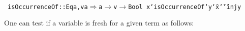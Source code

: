 \documentclass[9pt,authoryear]{sigplanconf}
\begin{document}
%
%
%
~\\~\vphantom{$\{$}\texttt{isOccurrenceOf}\texttt{\mbox{\hspace{0.50em}}}\texttt{{:}{:}}\texttt{\mbox{\hspace{0.50em}}}\texttt{\makebox[1.22ex][l]{$ {(} $}}\texttt{Eq}\texttt{\mbox{\hspace{0.50em}}}\texttt{a,}\texttt{\mbox{\hspace{0.50em}}}\texttt{v}\texttt{\mbox{\hspace{0.50em}}}\texttt{\makebox[1.22ex][c]{$ \in $}}\texttt{\mbox{\hspace{0.50em}}}\texttt{a}\texttt{\makebox[1.22ex][r]{$ {)} $}}\texttt{\mbox{\hspace{0.50em}}}\texttt{$ \Rightarrow $}\texttt{\mbox{\hspace{0.50em}}}\texttt{a}\texttt{\mbox{\hspace{0.50em}}}\texttt{$ \rightarrow $}\texttt{\mbox{\hspace{0.50em}}}\texttt{v}\texttt{\mbox{\hspace{0.50em}}}\texttt{$ \rightarrow $}\texttt{\mbox{\hspace{0.50em}}}\texttt{Bool}\texttt{{\nopagebreak \newline%
}\vphantom{$\{$}}\texttt{x}\texttt{\mbox{\hspace{0.50em}}}\texttt{{`}isOccurrenceOf{`}}\texttt{\mbox{\hspace{0.50em}}}\texttt{y}\texttt{\mbox{\hspace{0.50em}}}\texttt{{\char `\=}}\texttt{\mbox{\hspace{0.50em}}}\texttt{x}\texttt{\mbox{\hspace{0.50em}}}\texttt{{\char `\=}{\char `\=}}\texttt{\mbox{\hspace{0.50em}}}\texttt{inj}\texttt{\mbox{\hspace{0.50em}}}\texttt{y}\texttt{{\nopagebreak \newline%
}\vphantom{$\{$}}%


%
One can test if a variable is fresh for a given term as follows{:}%


{\nopagebreak }
\end{document}
